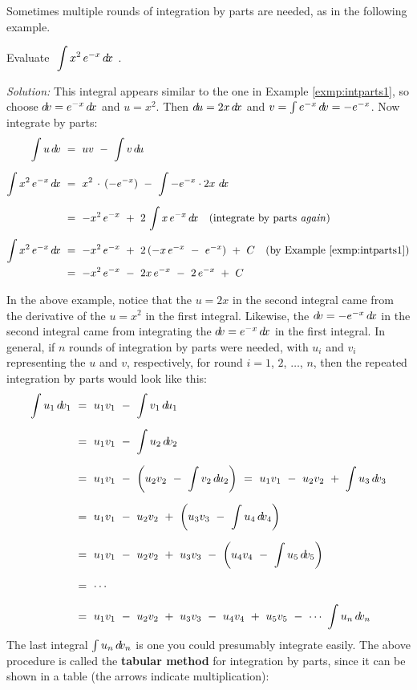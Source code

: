 \divider
\vspace{2mm}
Sometimes multiple rounds of integration by parts are needed, as in the
following example.
\newpage
\begin{exmp}\label{exmp:intparts5}
\noindent Evaluate $~\displaystyle\int x^2\,e^{-x}\,d\!x~$.\vspace{1mm}
\par\noindent\emph{Solution:} This integral appears similar to the one in
Example \ref{exmp:intparts1}, so choose $d\!v = e^{-x}\,d\!x$ and $u = x^2$. Then
$d\!u = 2x\,d\!x$ and $v = \int e^{-x}\,d\!v = -e^{-x}$. Now integrate by parts:
\begin{align*}
\int u\,d\!v ~&=~ uv ~-~ \int v\,d\!u\\[6pt]
\int x^2\,e^{-x}\,d\!x ~&=~ x^2\,\cdot\,(-e^{-x}) ~-~
 \int -e^{-x} \cdot 2x~d\!x\\[6pt]
&=~ -x^2\,e^{-x} ~+~ 2\,\int x\,e^{-x}\,d\!x\quad\text{(integrate by parts \emph{again})}\\[4pt]
\int x^2\,e^{-x}\,d\!x ~&=~ -x^2\,e^{-x} ~+~
 2\,(-x\,e^{-x} ~-~ e^{-x}) ~+~ C\quad\text{(by Example \ref{exmp:intparts1})}\\
&=~ -x^2\,e^{-x} ~-~ 2x\,e^{-x} ~-~ 2\,e^{-x} ~+~ C
\end{align*}
\end{exmp}\vspace{-2mm}
\divider
\vspace{2mm}

In the above example, notice that the $u=2x$ in the second integral came from
the derivative of the $u=x^2$ in the first integral. Likewise, the
$d\!v =-e^{-x}\,d\!x$ in the second integral came from integrating the
$d\!v=e^{-x}\,d\!x$ in the first integral. In general, if $n$ rounds of
integration by parts were needed, with $u_i$ and $v_i$ representing the $u$ and
$v$, respectively, for round $i =1$, $2$, $\ldots$, $n$, then the repeated
integration by parts would look like this:
\begin{align*}
\int u_1\,\dv_1 ~&=~ u_1v_1 ~-~ \int v_1\,\du_1\\[6pt]
&=~ u_1v_1 ~-~ \int u_2\,\dv_2\\[6pt]
&=~ u_1v_1 ~-~ \left(u_2v_2 ~-~ \int v_2\,\du_2\right) ~=~
    u_1v_1 ~-~ u_2v_2 ~+~ \int u_3\,\dv_3\\[6pt]
&=~ u_1v_1 ~-~ u_2v_2 ~+~ \left(u_3v_3 ~-~ \int u_4\,\dv_4\right)\\[6pt]
&=~ u_1v_1 ~-~ u_2v_2 ~+~ u_3v_3 ~-~ \left(u_4v_4 ~-~ \int u_5\,\dv_5\right)\\[6pt]
&=~ \cdots\\[6pt]
&=~ u_1v_1 ~-~ u_2v_2 ~+~ u_3v_3 ~-~ u_4v_4 ~+~ u_5v_5 ~-~ \cdots ~ \int u_n\,\dv_n
\end{align*}
The last integral $\int u_n\,d\!v_n$ is one you could presumably integrate
easily.
\newpage
The above procedure is called the
\textbf{tabular method} for integration by parts, since it can be shown in a table (the
arrows indicate multiplication):

